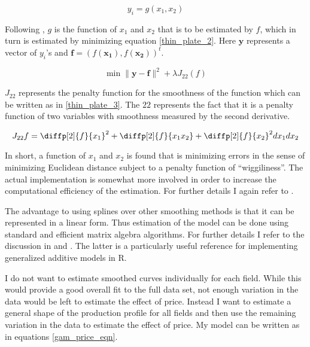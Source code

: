 \documentclass[12pt]{article}
\begin{document}
	\begin{equation}
	y_i = g(x_1, x_2)
	\label{thin_plate_1}
	\end{equation}

Following \citet{wood_generalized_2006}, $g$ is the function of $x_1$ and $x_2$ that is to be estimated by $f$, which in turn is estimated by minimizing equation \ref{thin_plate_2}.  Here $\boldsymbol{y}$ represents a vector of $y_i$’s and $\boldsymbol{f} = (f(\boldsymbol{x_1}),f(\boldsymbol{x_2}))^t$.   

	\begin{equation}
\min \|\boldsymbol{y-f}\|^2 + \lambda J_{22}(f)
\label{thin_plate_2}
	\end{equation}

$J_{22}$ represents the penalty function for the smoothness of the function which can be written as in \ref{thin_plate_3}.  The $22$ represents the fact that it is a penalty function of two variables with smoothness measured by the second derivative.

	\begin{equation}
	J_{22}{f}= \diffp[2]{f}{x_1}^2 + \diffp[2]{f}{{x_1}{x_2}} + \diffp[2]{f}{x_2}^2dx_1 dx_2
\label{thin_plate_3}
	\end{equation}

In short, a function of $x_1$ and $x_2$ is found that is minimizing errors in the sense of minimizing Euclidean distance subject to a penalty function of “wiggiliness”.  The actual implementation is somewhat more involved in order to increase the computational efficiency of the estimation.  For further details I again refer to \citet{wood_thin_2003}.

The advantage to using splines over other smoothing methods is that it can be represented in a linear form.  Thus estimation of the model can be done using standard and efficient matrix algebra algorithms. For further details I refer to the discussion in \citet{hastie_generalized_1990} and \citet{wood_generalized_2006}.  The latter is a particularly useful reference for implementing generalized additive models in R.

I do not want to estimate smoothed curves individually for each field.  While this would provide a good overall fit to the full data set, not enough variation in the data would be left to estimate the effect of price.  Instead I want to estimate a general shape of the production profile for all fields and then use the remaining variation in the data to estimate the effect of price.  My model can be written as in equations \ref{gam_price_eqn}.
\end{document}
